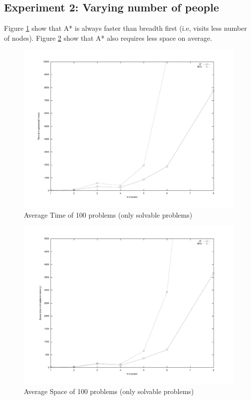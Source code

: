 \documentclass[letterpaper]{article}
\begin{document}
\subsection{Experiment 2: Varying number of people}
Figure \ref{fig:time} show that A* is always faster than breadth first (i.e, visits less number of nodes). Figure \ref{fig:space}
show that A* also requires less space on average.
\begin{figure}[!htb]
	\centering
	\includegraphics[scale=0.4]{./pics/time.pdf}
	\caption{Average Time of 100 problems (only solvable problems)}
	\label{fig:time}
\end{figure}
\begin{figure}[!htb]
	\centering
	\includegraphics[scale=0.4]{./pics/space.pdf}
	\caption{Average Space of 100 problems (only solvable problems)}
	\label{fig:space}
\end{figure}
\end{document}
